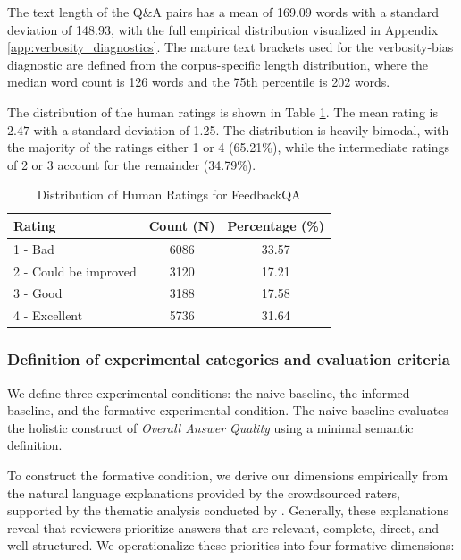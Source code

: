 The text length of the Q\&A pairs has a mean of 169.09 words with a standard deviation of 148.93, with the full empirical distribution visualized in Appendix \ref{app:verbosity_diagnostics}. The mature text brackets used for the verbosity-bias diagnostic are defined from the corpus-specific length distribution, where the median word count is 126 words and the 75th percentile is 202 words.


The distribution of the human ratings is shown in Table \ref{tab:human_ratings_dist}. The mean rating is $2.47$ with a standard deviation of 1.25. The distribution is heavily bimodal, with the majority of the ratings either 1 or 4 (65.21\%), while the intermediate ratings of 2 or 3 account for the remainder (34.79\%). 

\begin{table}
    \caption{Distribution of Human Ratings for FeedbackQA}\label{tab:human_ratings_dist}
    \begin{tabular}{lcc}
    \toprule
    Rating & Count (N) & Percentage (\%) \\
    \midrule
        1 - Bad & 6086 & 33.57 \\
        2 - Could be improved & 3120 & 17.21 \\
        3 - Good & 3188 & 17.58 \\
        4 - Excellent & 5736 & 31.64 \\
    \bottomrule
    \end{tabular}
\end{table}


\subsubsection{Definition of experimental categories and evaluation criteria}\label{sec:qa_experimentaldesign}


We define three experimental conditions: the naive baseline, the informed baseline, and the formative experimental condition. The naive baseline evaluates the holistic construct of \textit{Overall Answer Quality} using a minimal semantic definition.

To construct the formative condition, we derive our dimensions empirically from the natural language explanations provided by the crowdsourced raters, supported by the thematic analysis conducted by \citet{li_using_2022}. Generally, these explanations reveal that reviewers prioritize answers that are relevant, complete, direct, and well-structured. We operationalize these priorities into four formative dimensions:

